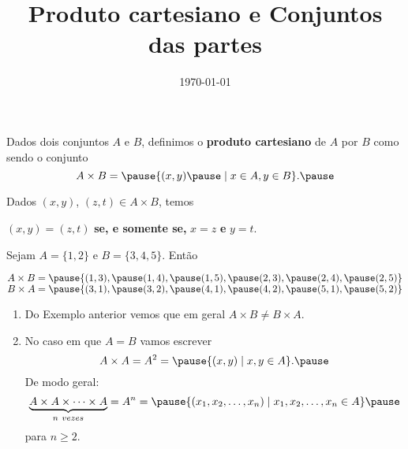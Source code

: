 \documentclass{beamer}
\title{Produto cartesiano e Conjuntos das partes}
\author[\autor]{\autor}
\institute[\instituto]{\instituto}
\date{\today}
\begin{document}
    \begin{frame}
        \maketitle
    \end{frame}


    \begin{frame}
        \begin{definicao}
        Dados dois conjuntos $A$ e $B$, \pause definimos o \textbf{produto cartesiano} \pause de $A$ por $B$ como sendo o conjunto\pause
        \[
            A \times B = \pause \{(x,y) \pause \mid x\in A, y\in B\}.\pause
        \]
        \end{definicao}

        Dados $(x,y)$, \pause $(z,t) \in A\times B$, \pause temos
        \begin{center}
            $(x,y) = (z,t)$ \pause \textbf{se, e somente se,} $x = z$ \pause \textbf{e} $y = t$.\pause
        \end{center}

        \begin{exemplo}\label{exemplo_produto_cartesiano}
            Sejam $A = \{1, 2\}$ \pause e $B = \{3, 4, 5\}$. \pause Ent\~ao\pause
            \begin{center}
                $A \times B = \pause \{(1,3), \pause (1,4), \pause  (1,5), \pause (2,3), \pause (2,4), \pause (2,5)\}$\pause\\
                $B \times A = \pause \{(3,1), \pause (3,2), \pause (4,1), \pause (4,2), \pause (5,1), \pause (5,2)\}$\pause
        \end{center}
        \end{exemplo}
    \end{frame}

    \begin{frame}
        \begin{observacoes}
            \begin{enumerate}[label={\arabic*})]
                \item Do Exemplo anterior \pause vemos que em geral $A \times B \neq B\times A$.\pause
                \item No caso em que $A = B$ \pause vamos escrever\pause
                \[
                    A \times A = A^2 = \pause \{ (x, y) \mid x, y \in A\}.\pause
                \]
                De modo geral:\pause
                \[
                    \underbrace{A \times A \times \cdots \times A}_{n\ vezes} = A^n = \pause \{ (x_1, x_2, \dots, x_n) \mid x_1, x_2, \dots, x_n \in A\}\pause
                \]
                para $n \ge 2$.
            \end{enumerate}
        \end{observacoes}
    \end{frame}
\end{document}
